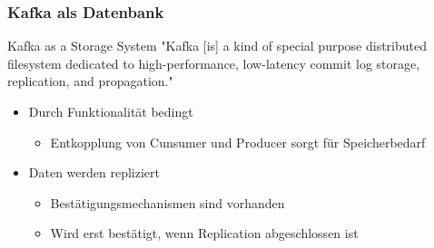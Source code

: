 %

\begin{frame}
\frametitle{Kafka als Datenbank}

\begin{block}{Kafka as a Storage System}
	"Kafka [is] a kind of special purpose distributed filesystem dedicated to high-performance, low-latency commit log storage, replication, and propagation." \cite{Kafka}
\end{block}


\begin{itemize}
	\item Durch Funktionalität bedingt
	\begin{itemize}
		\item Entkopplung  von Cunsumer und Producer sorgt für Speicherbedarf
	\end{itemize}
	\item Daten werden repliziert
	\begin{itemize}
		\item Bestätigungsmechanismen sind vorhanden
		\item Wird erst bestätigt, wenn Replication abgeschlossen ist
	\end{itemize}
\end{itemize}

\end{frame}



